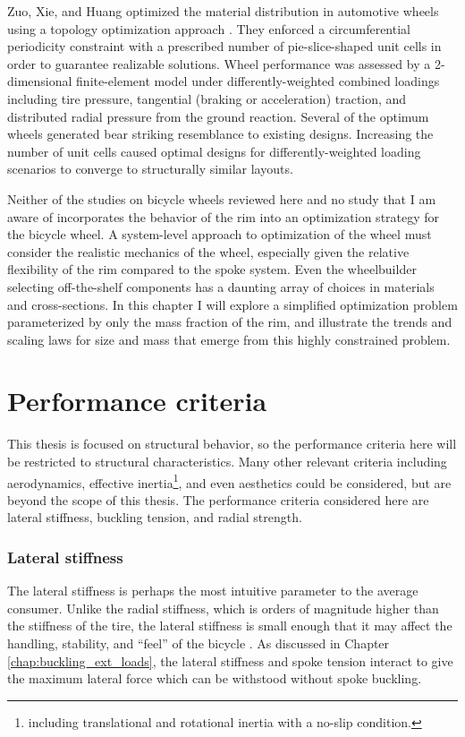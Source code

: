 \documentclass[\rootdir/thesis.tex]{subfiles}
\begin{document}
Zuo, Xie, and Huang optimized the material distribution in automotive wheels using a topology optimization approach \cite{Zuo2011}. They enforced a circumferential periodicity constraint with a prescribed number of pie-slice-shaped unit cells in order to guarantee realizable solutions. Wheel performance was assessed by a 2-dimensional finite-element model under differently-weighted combined loadings including tire pressure, tangential (braking or acceleration) traction, and distributed radial pressure from the ground reaction. Several of the optimum wheels generated bear striking resemblance to existing designs. Increasing the number of unit cells caused optimal designs for differently-weighted loading scenarios to converge to structurally similar layouts.

Neither of the studies on bicycle wheels \cite{Svensson2015,Keller2013} reviewed here and no study that I am aware of incorporates the behavior of the rim into an optimization strategy for the bicycle wheel. A system-level approach to optimization of the wheel must consider the realistic mechanics of the wheel, especially given the relative flexibility of the rim compared to the spoke system. Even the wheelbuilder selecting off-the-shelf components has a daunting array of choices in materials and cross-sections. In this chapter I will explore a simplified optimization problem parameterized by only the mass fraction of the rim, and illustrate the trends and scaling laws for size and mass that emerge from this highly constrained problem.


\section{Performance criteria}
\label{sec:performance_criteria}

This thesis is focused on structural behavior, so the performance criteria here will be restricted to structural characteristics. Many other relevant criteria including aerodynamics, effective inertia\footnote{including translational and rotational inertia with a no-slip condition.}, and even aesthetics could be considered, but are beyond the scope of this thesis. The performance criteria considered here are lateral stiffness, buckling tension, and radial strength.

\subsubsection*{Lateral stiffness}
The lateral stiffness is perhaps the most intuitive parameter to the average consumer. Unlike the radial stiffness, which is orders of magnitude higher than the stiffness of the tire, the lateral stiffness is small enough that it may affect the handling, stability, and ``feel'' of the bicycle \cite{Roe1978,Spierings1981}. As discussed in Chapter \ref{chap:buckling_ext_loads}, the lateral stiffness and spoke tension interact to give the maximum lateral force which can be withstood without spoke buckling.
\end{document}
